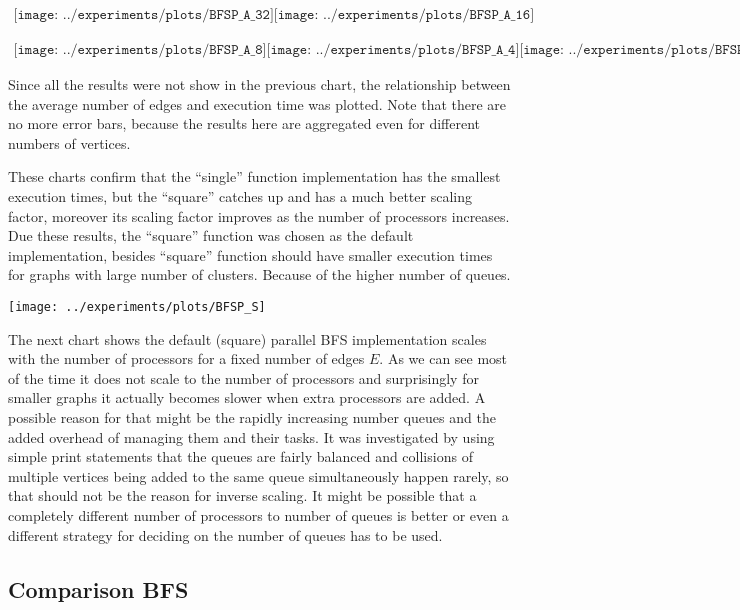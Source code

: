 \documentclass{report}
\theoremstyle{plain}
\theoremstyle{definition}
\theoremstyle{remark}
\begin{document}
\begin{center}
$
\begin{array}{cc}
\texttt{[image: ../experiments/plots/BFSP\_A\_32]}
\texttt{[image: ../experiments/plots/BFSP\_A\_16]}
\end{array}
$

\center
$
\begin{array}{cc}
\texttt{[image: ../experiments/plots/BFSP\_A\_8]}
\texttt{[image: ../experiments/plots/BFSP\_A\_4]}
\texttt{[image: ../experiments/plots/BFSP\_A\_2]}
\end{array}
$
\end{center}

Since all the results were not show in the previous chart, the relationship between the average number of edges and execution time was plotted. Note that there are no more error bars, because the results here are aggregated even for different numbers of vertices.

These charts confirm that the ``single'' function implementation has the smallest execution times, but the ``square'' catches up and has a much better scaling factor, moreover its scaling factor improves as the number of processors increases. Due these results, the ``square'' function was chosen as the default implementation, besides ``square'' function should have smaller execution times for graphs with large number of clusters. Because of the higher number of queues.

\texttt{[image: ../experiments/plots/BFSP\_S]}

The next chart shows the default (square) parallel BFS implementation scales with the number of processors for a fixed number of edges $E$. As we can see most of the time it does not scale to the number of processors and surprisingly for smaller graphs it actually becomes slower when extra processors are added. A possible reason  for that might be the rapidly increasing number queues and the added overhead of managing them and their tasks. It was investigated by using simple print statements that the queues are fairly balanced and collisions of multiple vertices being added to the same queue simultaneously happen rarely, so that should not be the reason for inverse scaling. It might be possible that a completely different number of processors to number of queues is better or even a different strategy for deciding on the number of queues has to be used.

\subsection{Comparison BFS}
\end{document}
